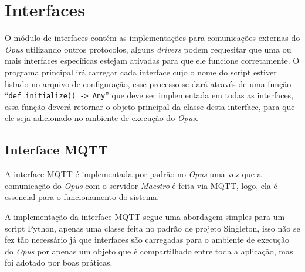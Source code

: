 \section{Interfaces}
\label{opus-sec:interfaces}

O módulo de interfaces contém as implementações para comunicações externas do \emph{Opus} utilizando outros protocolos,
alguns \emph{drivers} podem requesitar que uma ou mais interfaces específicas estejam ativadas para que ele funcione corretamente.
O programa principal irá carregar cada interface cujo o nome do script estiver listado no arquivo de configuração, esse processo
se dará através de uma função ``\lstinline{def initialize() -> Any}'' que deve ser implementada em todas as interfaces, essa função
deverá retornar o objeto principal da classe desta interface, para que ele seja adicionado no ambiente de execução do \emph{Opus}.

\subsection{Interface MQTT}
\label{opus-sec:interfaces-mqtt}
A interface MQTT é implementada por padrão no \emph{Opus} uma vez que a comunicação do \emph{Opus} com o servidor \emph{Maestro}
é feita via MQTT, logo, ela é essencial para o funcionamento do sistema.

A implementação da interface MQTT segue uma abordagem simples para um script Python, apenas uma classe feita no padrão de 
projeto Singleton, isso não se fez tão necessário já que interfaces são carregadas para o ambiente de execução do 
\emph{Opus} por apenas um objeto que é compartilhado entre toda a aplicação, mas foi adotado por boas práticas.

